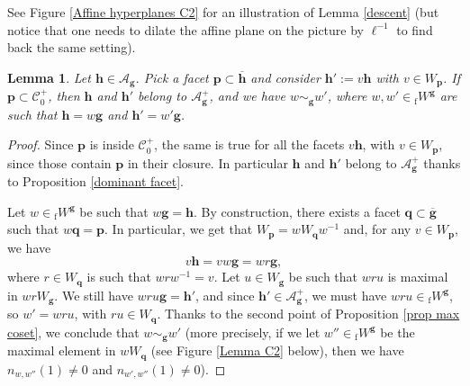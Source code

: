 \documentclass[11pt]{amsart}
\theoremstyle{plain}
\newtheorem{lem}[thm]{Lemma}
\theoremstyle{remark}
\numberwithin{equation}{section}
\begin{document}
	See Figure \ref{Affine hyperplanes C2} for an illustration of Lemma \ref{descent} (but notice that one needs to dilate the affine plane on the picture by $\ell^{-1}$ to find back the same setting).
	\begin{lem}\label{desending facets}
		Let $\mathbf{h}\in\mathcal{A}_\mathbf{g}$. Pick a facet $\mathbf{p}\subset\overline{\mathbf{h}}$ and consider $\mathbf{h}':=v\mathbf{h}$ with $v\in W_\mathbf{p}$. If $\mathbf{p}\subset \mathscr{C}^+_0$, then $\mathbf{h}$ and $\mathbf{h}'$ belong to $\mathcal{A}^+_\mathbf{g}$, and we have $w\sim_{\mathbf{g}}w'$, where $w,w'\in {_{\mathrm{f}}W}^\mathbf{g}$ are such that $\mathbf{h}=w\mathbf{g}$ and $\mathbf{h}'=w'\mathbf{g}$. 
	\end{lem}
	\begin{proof}
		Since $\mathbf{p}$ is inside $\mathscr{C}^+_0$, the same is true for all the facets $v\mathbf{h}$, with $v\in W_\mathbf{p}$, since those contain $\mathbf{p}$ in their closure. In particular $\mathbf{h}$ and $\mathbf{h}'$ belong to $\mathcal{A}^+_\mathbf{g}$ thanks to Proposition \ref{dominant facet}.
		
		Let $w\in {_{\mathrm{f}}W}^\mathbf{g}$ be such that $w\mathbf{g}=\mathbf{h}$. By construction, there exists a facet $\mathbf{q}\subset\overline{\mathbf{g}}$ such that $w\mathbf{q}=\mathbf{p}$. In particular, we get that $W_\mathbf{p}=wW_\mathbf{q}w^{-1}$ and, for any $v\in  W_\mathbf{p}$, we have
		$$v\mathbf{h}=vw\mathbf{g}=wr\mathbf{g},$$
		where $r\in W_\mathbf{q}$ is such that $wrw^{-1}=v$. Let $u\in W_\mathbf{g}$ be such that $wru$ is maximal in $wrW_\mathbf{g}$. We still have $wru\mathbf{g}=\mathbf{h}'$, and since $\mathbf{h}'\in\mathcal{A}^+_\mathbf{g}$, we must have $wru\in  {_{\mathrm{f}}W}^\mathbf{g}$, so $w'=wru$, with $ru\in W_\mathbf{q}$. Thanks to the second point of Proposition \ref{prop max coset}, we conclude that $w\sim_{\mathbf{g}}w'$ (more precisely, if we let $w''\in {_{\mathrm{f}}W}^\mathbf{g}$ be the maximal element in $wW_\mathbf{q}$ (see Figure \ref{Lemma C2} below), then we have $n_{w,w''}(1)\neq 0$ and $n_{w',w''}(1)\neq0$).
	\end{proof}
\end{document}
